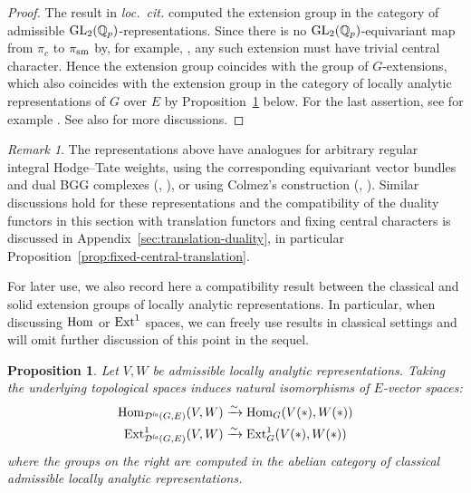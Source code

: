 \documentclass[a4paper,10pt]{amsart}
\theoremstyle{remark}
\newtheorem{remark}[theorem]{Remark}
\theoremstyle{definition}
\theoremstyle{plain}
\newtheorem{proposition}[theorem]{Proposition}
\numberwithin{equation}{section}
\newcommand{\bbQ}{{\mathbb Q}}
\newcommand{\calD}{{\mathcal D}}
\newcommand{\Ext}{{\rm Ext}}
\newcommand{\GL}{{\rm GL}}
\newcommand{\Hom}{{\rm Hom}}
\newcommand{\la}{{\it la}}
\newcommand{\sm}{{\rm sm}}
\begin{document}
\begin{proof}
	The result in \emph{loc.\ cit.} computed the extension group in the category of admissible $\GL_2(\bbQ_p)$-representations. Since there is no $\GL_2(\bbQ_p)$-equivariant map from $\pi_c$ to $\pi_{\sm}$ by, for example, \cite[Prop.~2.5.2]{su2025locally}, any such extension must have trivial central character. Hence the extension group coincides with the group of $G$-extensions, which also coincides with the extension group in the category of locally analytic representations of $G$ over $E$ by Proposition~\ref{prop:classical-solid-Hom-Ext} below.  For the last assertion, see for example \cite[Prop.~2.6.3]{su2025locally}. See also \cite[Thm.~2.5.7 \& Thm.~3.2.2 \& Rem.~3.2.4]{su2025locally} for more discussions.
\end{proof}
\begin{remark}\label{rem:general-integral-weights}
The representations above have analogues for arbitrary regular integral
Hodge--Tate weights, using the corresponding equivariant vector bundles
and dual BGG complexes (\cite[Rem.~1.3(a) and Rem.~11.12]{dospinescuLeBras2017revetements},
\cite[\S2.2]{su2025locally}), or using Colmez's construction (\cite{colmez2018poids}, \cite[Thm.~1.1]{ding2023change}). Similar discussions hold for these representations and the compatibility of the duality
functors in this section with translation functors and fixing central characters is discussed in Appendix~\ref{sec:translation-duality}, in particular
Proposition~\ref{prop:fixed-central-translation}.
\end{remark}

For later use, we also record here a compatibility result between the classical and solid extension groups of locally analytic representations. In particular, when discussing $\Hom$ or $\Ext^1$ spaces, we can freely use results in classical settings and will omit further discussion of this point in the sequel.
\begin{proposition}\label{prop:classical-solid-Hom-Ext}
Let $V,W$ be admissible locally analytic representations. Taking the underlying topological spaces induces natural isomorphisms of $E$-vector spaces:
\[
\begin{aligned}
	\Hom_{\calD^{\la}(G,E)}(V,W)&\xrightarrow{\sim} \Hom_{G}(V(*),W(*))\\
	\Ext^1_{\calD^{\la}(G,E)}(V,W)&\xrightarrow{\sim} \Ext^1_{G}(V(*),W(*))
\end{aligned}
\]
where the groups on the right are computed in the abelian category of
classical admissible locally analytic representations.
\end{proposition}
\end{document}
